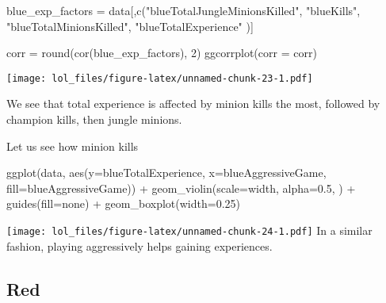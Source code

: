 \documentclass[
]{article}
\newenvironment{Shaded}{\begin{snugshade}}{\end{snugshade}}
\newcommand{\AttributeTok}[1]{\textcolor[rgb]{0.77,0.63,0.00}{#1}}
\newcommand{\DecValTok}[1]{\textcolor[rgb]{0.00,0.00,0.81}{#1}}
\newcommand{\FloatTok}[1]{\textcolor[rgb]{0.00,0.00,0.81}{#1}}
\newcommand{\FunctionTok}[1]{\textcolor[rgb]{0.00,0.00,0.00}{#1}}
\newcommand{\NormalTok}[1]{#1}
\newcommand{\OtherTok}[1]{\textcolor[rgb]{0.56,0.35,0.01}{#1}}
\newcommand{\SpecialCharTok}[1]{\textcolor[rgb]{0.00,0.00,0.00}{#1}}
\newcommand{\StringTok}[1]{\textcolor[rgb]{0.31,0.60,0.02}{#1}}
\begin{document}
\begin{Shaded}
\begin{Highlighting}[]
\NormalTok{blue\_exp\_factors }\OtherTok{=}\NormalTok{ data[,}\FunctionTok{c}\NormalTok{(}\StringTok{"blueTotalJungleMinionsKilled"}\NormalTok{, }
                            \StringTok{"blueKills"}\NormalTok{,}
                            \StringTok{"blueTotalMinionsKilled"}\NormalTok{,}
                            \StringTok{"blueTotalExperience"}
\NormalTok{                            )]}

\NormalTok{corr }\OtherTok{=} \FunctionTok{round}\NormalTok{(}\FunctionTok{cor}\NormalTok{(blue\_exp\_factors), }\DecValTok{2}\NormalTok{)}
\FunctionTok{ggcorrplot}\NormalTok{(}\AttributeTok{corr =}\NormalTok{ corr)}
\end{Highlighting}
\end{Shaded}

\texttt{[image: lol\_files/figure-latex/unnamed-chunk-23-1.pdf]}

We see that total experience is affected by minion kills the most,
followed by champion kills, then jungle minions.

Let us see how minion kills

\begin{Shaded}
\begin{Highlighting}[]
\FunctionTok{ggplot}\NormalTok{(data, }\FunctionTok{aes}\NormalTok{(}\AttributeTok{y=}\NormalTok{blueTotalExperience, }\AttributeTok{x=}\NormalTok{blueAggressiveGame, }\AttributeTok{fill=}\NormalTok{blueAggressiveGame)) }\SpecialCharTok{+} 
  \FunctionTok{geom\_violin}\NormalTok{(}\AttributeTok{scale=}\StringTok{\textquotesingle{}width\textquotesingle{}}\NormalTok{, }\AttributeTok{alpha=}\FloatTok{0.5}\NormalTok{, ) }\SpecialCharTok{+}
  \FunctionTok{guides}\NormalTok{(}\AttributeTok{fill=}\StringTok{\textquotesingle{}none\textquotesingle{}}\NormalTok{) }\SpecialCharTok{+} 
  \FunctionTok{geom\_boxplot}\NormalTok{(}\AttributeTok{width=}\FloatTok{0.25}\NormalTok{)}
\end{Highlighting}
\end{Shaded}

\texttt{[image: lol\_files/figure-latex/unnamed-chunk-24-1.pdf]} In a
similar fashion, playing aggressively helps gaining experiences.

\hypertarget{red}{%
\subsection{Red}\label{red}}
\end{document}
